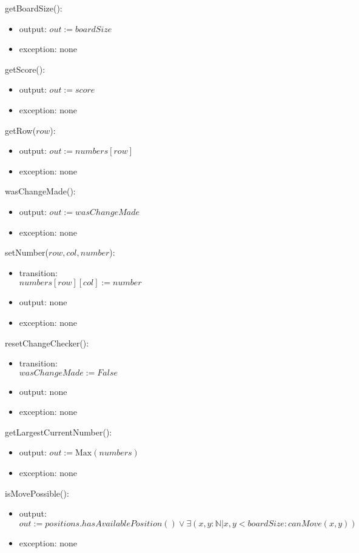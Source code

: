 \documentclass[12pt]{article}
\begin{document}
\noindent getBoardSize():
\begin{itemize}
\item output: $out := boardSize$
\item exception: none
\end{itemize}   

\noindent getScore():
\begin{itemize}
\item output: $out := score$
\item exception: none
\end{itemize}   

\noindent getRow($row$):
\begin{itemize}
\item output: $out := numbers[row]$
\item exception: none
\end{itemize}  

\noindent wasChangeMade():
\begin{itemize}
\item output: $out := wasChangeMade$
\item exception: none
\end{itemize}  

\noindent setNumber($row, col, number$):
\begin{itemize}
\item transition: \\
$numbers[row][col] := number$
\item output: none
\item exception: none
\end{itemize}  

\noindent resetChangeChecker():
\begin{itemize}
\item transition: \\
$wasChangeMade := False$
\item output: none
\item exception: none
\end{itemize}  

\noindent getLargestCurrentNumber():
\begin{itemize}
\item output: $out := \text{Max}(numbers)$
\item exception: none
\end{itemize}  

\noindent isMovePossible():
\begin{itemize}
\item output: $out := positions.hasAvailablePosition() \vee \exists (x, y : \mathbb{N} | x, y < boardSize : canMove(x, y))$
\item exception: none
\end{itemize} 
\end{document}

